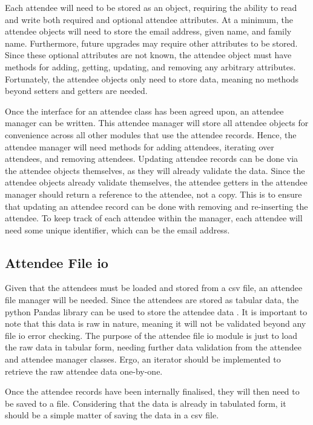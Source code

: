 \documentclass[11pt]{article}
\begin{document}
Each attendee will need to be stored as an \gls{object}, requiring the ability to read and write both required and optional attendee attributes. At a minimum, the attendee \glspl{object} will need to store the email address, given name, and family name. Furthermore, future upgrades may require other attributes to be stored. Since these optional attributes are not known, the attendee \gls{object} must have methods for adding, getting, updating, and removing any arbitrary attributes. Fortunately, the attendee \glspl{object} only need to store data, meaning no methods beyond setters and getters are needed.

Once the interface for an attendee \gls{class} has been agreed upon, an attendee manager can be written. This attendee manager will store all attendee \glspl{object} for convenience across all other modules that use the attendee records. Hence, the attendee manager will need methods for adding attendees, iterating over attendees, and removing attendees. Updating attendee records can be done via the attendee \glspl{object} themselves, as they will already validate the data. Since the attendee \glspl{object} already validate themselves, the attendee getters in the attendee manager should return a reference to the attendee, not a copy. This is to ensure that updating an attendee record can be done with removing and re-inserting the attendee. To keep track of each attendee within the manager, each attendee will need some unique identifier, which can be the email address.

\subsection{Attendee File \acrshort{io}}

Given that the attendees must be loaded and stored from a \acrshort{csv} file, an attendee file manager will be needed. Since the attendees are stored as tabular data, the \Gls{python} Pandas \gls{library} can be used to store the attendee data \cite{pandas}. It is important to note that this data is raw in nature, meaning it will not be validated beyond any file \acrshort{io} error checking. The purpose of the attendee file \acrshort{io} module is just to load the raw data in tabular form, needing further data validation from the attendee and attendee manager classes. Ergo, an iterator should be implemented to retrieve the raw attendee data one-by-one.

Once the attendee records have been internally finalised, they will then need to be saved to a file. Considering that the data is already in tabulated form, it should be a simple matter of saving the data in a \acrshort{csv} file.
\end{document}
